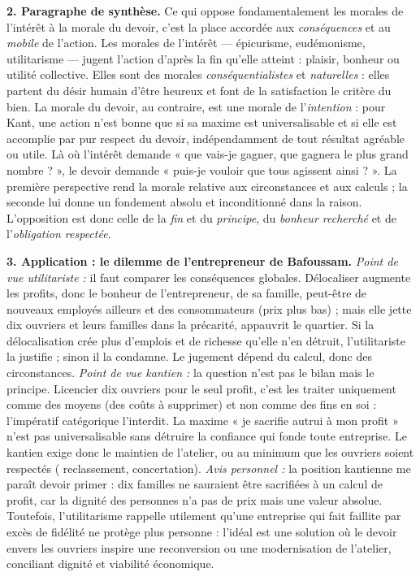 \documentclass[11pt]{article}
\begin{document}
\begin{corrige}
\textbf{2. Paragraphe de synthèse.} Ce qui oppose fondamentalement les morales de l'intérêt à la morale du devoir, c'est la place accordée aux \emph{conséquences} et au \emph{mobile} de l'action. Les morales de l'intérêt — épicurisme, eudémonisme, utilitarisme — jugent l'action d'après la fin qu'elle atteint : plaisir, bonheur ou utilité collective. Elles sont des morales \emph{conséquentialistes} et \emph{naturelles} : elles partent du désir humain d'être heureux et font de la satisfaction le critère du bien. La morale du devoir, au contraire, est une morale de l'\emph{intention} : pour Kant, une action n'est bonne que si sa maxime est universalisable et si elle est accomplie par pur respect du devoir, indépendamment de tout résultat agréable ou utile. Là où l'intérêt demande « que vais-je gagner, que gagnera le plus grand nombre ? », le devoir demande « puis-je vouloir que tous agissent ainsi ? ». La première perspective rend la morale relative aux circonstances et aux calculs ; la seconde lui donne un fondement absolu et inconditionné dans la raison. L'opposition est donc celle de la \emph{fin} et du \emph{principe}, du \emph{bonheur recherché} et de l'\emph{obligation respectée}.

\textbf{3. Application : le dilemme de l'entrepreneur de Bafoussam.}
\emph{Point de vue utilitariste :} il faut comparer les conséquences globales. Délocaliser augmente les profits, donc le bonheur de l'entrepreneur, de sa famille, peut-être de nouveaux employés ailleurs et des consommateurs (prix plus bas) ; mais elle jette dix ouvriers et leurs familles dans la précarité, appauvrit le quartier. Si la délocalisation crée plus d'emplois et de richesse qu'elle n'en détruit, l'utilitariste la justifie ; sinon il la condamne. Le jugement dépend du calcul, donc des circonstances.
\emph{Point de vue kantien :} la question n'est pas le bilan mais le principe. Licencier dix ouvriers pour le seul profit, c'est les traiter uniquement comme des moyens (des coûts à supprimer) et non comme des fins en soi : l'impératif catégorique l'interdit. La maxime « je sacrifie autrui à mon profit » n'est pas universalisable sans détruire la confiance qui fonde toute entreprise. Le kantien exige donc le maintien de l'atelier, ou au minimum que les ouvriers soient respectés ( reclassement, concertation).
\emph{Avis personnel :} la position kantienne me paraît devoir primer : dix familles ne sauraient être sacrifiées à un calcul de profit, car la dignité des personnes n'a pas de prix mais une valeur absolue. Toutefois, l'utilitarisme rappelle utilement qu'une entreprise qui fait faillite par excès de fidélité ne protège plus personne : l'idéal est une solution où le devoir envers les ouvriers inspire une reconversion ou une modernisation de l'atelier, conciliant dignité et viabilité économique.


\end{corrige}
\end{document}
